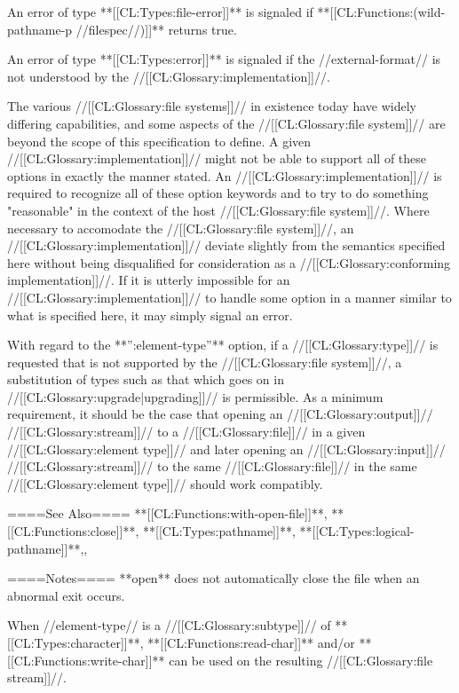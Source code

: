 An error of type **[[CL:Types:file-error]]** is signaled if **[[CL:Functions:(wild-pathname-p //filespec//)]]** returns true.

An error of type **[[CL:Types:error]]** is signaled if the //external-format// is not understood by the //[[CL:Glossary:implementation]]//.

The various //[[CL:Glossary:file systems]]// in existence today have widely differing capabilities, and some aspects of the //[[CL:Glossary:file system]]// are beyond the scope of this specification to define. A given //[[CL:Glossary:implementation]]// might not be able to support all of these options in exactly the manner stated. An //[[CL:Glossary:implementation]]// is required to recognize all of these option keywords and to try to do something "reasonable" in the context of the host //[[CL:Glossary:file system]]//. Where necessary to accomodate the //[[CL:Glossary:file system]]//, an //[[CL:Glossary:implementation]]// deviate slightly from the semantics specified here without being disqualified for consideration as a //[[CL:Glossary:conforming implementation]]//. If it is utterly impossible for an //[[CL:Glossary:implementation]]// to handle some option in a manner similar to what is specified here, it may simply signal an error.

With regard to the **'':element-type''** option, if a //[[CL:Glossary:type]]// is requested that is not supported by the //[[CL:Glossary:file system]]//, a substitution of types such as that which goes on in //[[CL:Glossary:upgrade|upgrading]]// is permissible. As a minimum requirement, it should be the case that opening an //[[CL:Glossary:output]]// //[[CL:Glossary:stream]]// to a //[[CL:Glossary:file]]// in a given //[[CL:Glossary:element type]]// and later opening an //[[CL:Glossary:input]]// //[[CL:Glossary:stream]]// to the same //[[CL:Glossary:file]]// in the same //[[CL:Glossary:element type]]// should work compatibly.

====See Also====
**[[CL:Functions:with-open-file]]**, **[[CL:Functions:close]]**, **[[CL:Types:pathname]]**, **[[CL:Types:logical-pathname]]**,{\secref\MergingPathnames},

{\secref\PathnamesAsFilenames}

====Notes====
**open** does not automatically close the file when an abnormal exit occurs.

When //element-type// is a //[[CL:Glossary:subtype]]// of **[[CL:Types:character]]**, **[[CL:Functions:read-char]]** and/or **[[CL:Functions:write-char]]** can be used on the resulting //[[CL:Glossary:file stream]]//.

